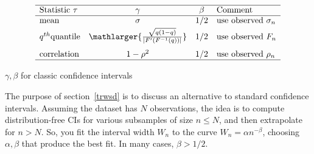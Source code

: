 \documentclass[oneside,10pt]{book}
\renewcommand{\arraystretch}{1.4} %
\begin{document}
\renewcommand{\arraystretch}{1.0} %
\renewcommand{\arraystretch}{1.2} %
\begin{table}[H]
\[
\begin{array}{lccl}
\hline
 \text{Statistic } \tau &  \gamma  & \beta & \text{Comment}   \\
\hline
\text{mean}	&	\sigma & 1/2 &  \text{use observed } \sigma_n \\[0.5ex]
q^{th} \text{quantile}	&  \mathlarger{ \frac{\sqrt{q(1-q)}}{|F' (F^{-1}(q))|}    } & 1/2 & \text{use observed $F_n$} \\[2ex]
\text{correlation} &    1-\rho^2  & 1/2 & \text{use observed } \rho_n \\
\hline
\end{array}
\]
\caption{\label{mse112dsdcx12} $\gamma,\beta$ for classic confidence intervals}
\end{table}
\renewcommand{\arraystretch}{1.0} %

The purpose of section~\ref{trwsd} is to discuss an alternative to standard confidence intervals. Assuming the dataset has
 $N$ observations, the idea is to compute distribution-free CIs for various subsamples of size $n\leq N$, and then extrapolate for 
 $n > N$. So, you fit the interval width $W_n$ to the curve $W_n = \alpha n^{-\beta}$, choosing $\alpha,\beta$ that produce the best fit.
 In many cases, $\beta > 1/2$.
\end{document}
